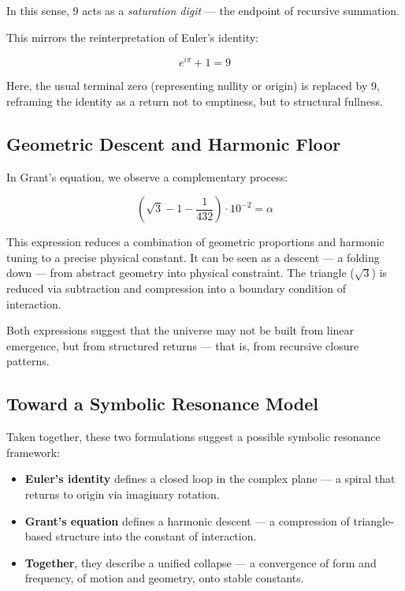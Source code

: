 \documentclass[12pt]{article}
\begin{document}
In this sense, 9 acts as a \textit{saturation digit} — the endpoint of recursive summation.

This mirrors the reinterpretation of Euler’s identity:

\[
e^{i\pi} + 1 = 9
\]

Here, the usual terminal zero (representing nullity or origin) is replaced by 9, reframing the identity as a return not to emptiness, but to structural fullness.

\subsection*{Geometric Descent and Harmonic Floor}

In Grant’s equation, we observe a complementary process:

\[
\left( \sqrt{3} - 1 - \frac{1}{432} \right) \cdot 10^{-2} = \alpha
\]

This expression reduces a combination of geometric proportions and harmonic tuning to a precise physical constant. It can be seen as a descent — a folding down — from abstract geometry into physical constraint. The triangle (\( \sqrt{3} \)) is reduced via subtraction and compression into a boundary condition of interaction.

Both expressions suggest that the universe may not be built from linear emergence, but from structured returns — that is, from recursive closure patterns.

\subsection*{Toward a Symbolic Resonance Model}

Taken together, these two formulations suggest a possible symbolic resonance framework:

\begin{itemize}[leftmargin=1.5em]
    \item \textbf{Euler's identity} defines a closed loop in the complex plane — a spiral that returns to origin via imaginary rotation.
    \item \textbf{Grant’s equation} defines a harmonic descent — a compression of triangle-based structure into the constant of interaction.
    \item \textbf{Together}, they describe a unified collapse — a convergence of form and frequency, of motion and geometry, onto stable constants.
\end{itemize}
\end{document}

